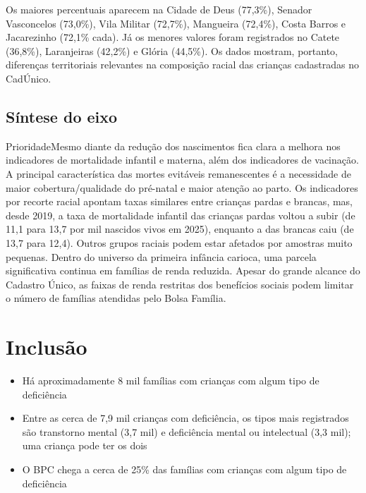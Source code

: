 Os maiores percentuais aparecem na Cidade de Deus (77,3\%), Senador Vasconcelos (73,0\%), Vila Militar (72,7\%), Mangueira (72,4\%), Costa Barros e Jacarezinho (72,1\% cada). Já os menores valores foram registrados no Catete (36,8\%), Laranjeiras (42,2\%) e Glória (44,5\%). Os dados mostram, portanto, diferenças territoriais relevantes na composição racial das crianças cadastradas no CadÚnico.


\section{Síntese do eixo}

\begin{sintese}{Prioridade}Mesmo diante da redução dos nascimentos fica clara a melhora nos indicadores de mortalidade infantil e materna, além dos indicadores de vacinação. A principal característica das mortes evitáveis remanescentes é a necessidade de maior cobertura/qualidade do pré-natal e maior atenção ao parto. Os indicadores por recorte racial apontam taxas similares entre crianças pardas e brancas, mas, desde 2019, a taxa de mortalidade infantil das crianças pardas voltou a subir (de 11,1 para 13,7 por mil nascidos vivos em 2025), enquanto a das brancas caiu (de 13,7 para 12,4). Outros grupos raciais podem estar afetados por amostras muito pequenas. Dentro do universo da primeira infância carioca, uma parcela significativa continua em famílias de renda reduzida. Apesar do grande alcance do Cadastro Único, as faixas de renda restritas dos benefícios sociais podem limitar o número de famílias atendidas pelo Bolsa Família.\end{sintese}


\chapter{Inclusão}\label{cap:eixo-2}

\begin{achados}\begin{itemize}

\item Há aproximadamente 8 mil famílias com crianças com algum tipo de deficiência

\item Entre as cerca de 7,9 mil crianças com deficiência, os tipos mais registrados são transtorno mental (3,7 mil) e deficiência mental ou intelectual (3,3 mil); uma criança pode ter os dois

\item O BPC chega a cerca de 25\% das famílias com crianças com algum tipo de deficiência

\end{itemize}\end{achados}

